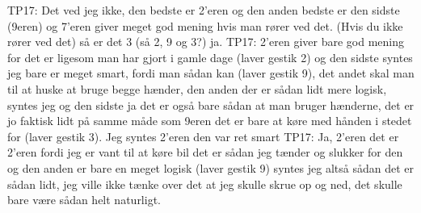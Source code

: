 TP17: Det ved jeg ikke, den bedste er 2’eren og den anden bedste er den sidste (9eren) og 7’eren giver meget god mening hvis man rører ved det.  (Hvis du ikke rører ved det) så er det 3 (så 2, 9 og 3?) ja.
TP17: 2’eren giver bare god mening for det er ligesom man har gjort i gamle dage (laver gestik 2) og den sidste syntes jeg bare er meget smart, fordi man sådan kan (laver gestik 9), det andet skal man til at huske at bruge begge hænder, den anden der er sådan lidt mere logisk, syntes jeg og den sidste ja det er også bare sådan at man bruger hænderne, det er jo faktisk lidt på samme måde som 9eren det er bare at køre med hånden i stedet for (laver gestik 3). Jeg syntes 2’eren den var ret smart
TP17: Ja, 2’eren det er 2’eren fordi jeg er vant til at køre bil det er sådan jeg tænder og slukker for den og den anden er bare en meget logisk (laver gestik 9) syntes jeg altså sådan det er sådan lidt, jeg ville ikke tænke over det at jeg skulle skrue op og ned, det skulle bare være sådan helt naturligt.

















